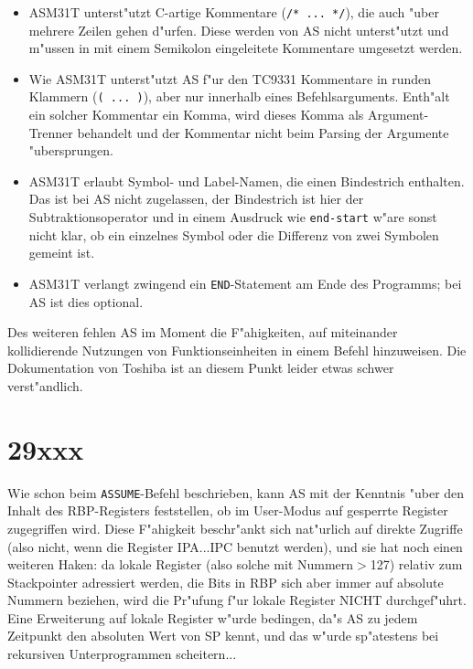 \documentclass[12pt,a4paper,twoside]{report}
\newcommand{\tty}[1]{{\tt #1}}
\begin{document}
\begin{itemize}
\item{ASM31T unterst"utzt C-artige Kommentare (\verb!/* ... */!),
      die auch "uber mehrere Zeilen gehen d"urfen.  Diese werden
      von AS nicht unterst"utzt und m"ussen in mit einem
      Semikolon eingeleitete Kommentare umgesetzt werden.}
\item{Wie ASM31T unterst"utzt AS f"ur den TC9331 Kommentare in
      runden Klammern (\verb!( ... )!), aber nur innerhalb
      eines Befehlsarguments.  Enth"alt ein solcher Kommentar ein
      Komma, wird dieses Komma als Argument-Trenner behandelt und
      der Kommentar nicht beim Parsing der Argumente
      "ubersprungen.}
\item{ASM31T erlaubt Symbol- und Label-Namen, die einen
      Bindestrich enthalten.  Das ist bei AS nicht zugelassen,
      der Bindestrich ist hier der Subtraktionsoperator und in
      einem Ausdruck wie \verb!end-start! w"are sonst nicht klar,
      ob ein einzelnes Symbol oder die Differenz von zwei
      Symbolen gemeint ist.}
\item{ASM31T verlangt zwingend ein \tty{END}-Statement am Ende
      des Programms; bei AS ist dies optional.}
\end{itemize}

Des weiteren fehlen AS im Moment die F"ahigkeiten, auf
miteinander kollidierende Nutzungen von Funktionseinheiten in
einem Befehl hinzuweisen.  Die Dokumentation von Toshiba ist an
diesem Punkt leider etwas schwer verst"andlich.


\section{29xxx}

Wie schon beim \tty{ASSUME}-Befehl beschrieben, kann AS mit der Kenntnis
"uber den Inhalt des RBP-Registers feststellen, ob im User-Modus
auf gesperrte Register zugegriffen wird.  Diese F"ahigkeit
beschr"ankt sich nat"urlich auf direkte Zugriffe (also nicht, wenn
die Register IPA...IPC benutzt werden), und sie hat noch einen
weiteren Haken: da lokale Register (also solche mit Nummern$>$127)
relativ zum Stackpointer adressiert werden, die Bits in RBP sich
aber immer auf absolute Nummern beziehen, wird die Pr"ufung f"ur
lokale Register NICHT durchgef"uhrt.  Eine Erweiterung auf lokale
Register w"urde bedingen, da"s AS zu jedem Zeitpunkt den absoluten
Wert von SP kennt, und das w"urde sp"atestens bei rekursiven
Unterprogrammen scheitern...
\end{document}
